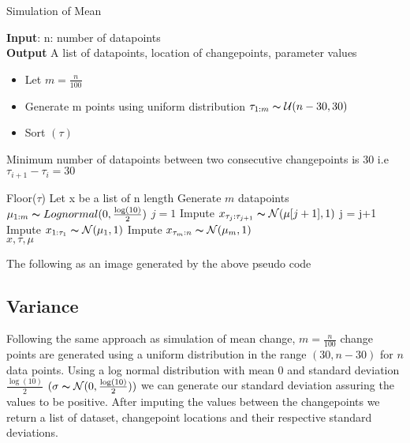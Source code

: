 \documentclass{article}
\newcommand\tab[1][0.4cm]{\hspace*{#1}}
\begin{document}
\begin{algorithm}
\caption{Simulation of Mean}\label{alg:cap}
\textbf{Input}: n: number of datapoints\\
\textbf{Output} A list of datapoints, location of changepoints, parameter values
\begin{algorithmic}
\begin{itemize}
    \item  Let $ m = \frac{n}{100}$
    \item  Generate m points using uniform distribution $\tau_{1:m} \thicksim \mathcal{U} (n-30,30)$ 
    \item  Sort $(\tau)$
\end{itemize}
     \Ensure Minimum number of datapoints between two consecutive changepoints \tab \tab \tab \tab \quad is 30 i.e $\tau_{i+1} - \tau_{i} = 30$ 

\State Floor($\tau$)
\State Let x be a list of n length
\State Generate $m$ datapoints $\mu_{1:m} \thicksim Lognormal(0,\frac{\log(10)}{2})$
\State $j = 1$
    \State Impute  $x_{\tau_{j} : \tau_{j+1}} \thicksim \mathcal{N}(\mu[j+1],1)$
    \State j = j+1
\EndWhile
\State Impute $x_{1:\tau_{1}} \thicksim \mathcal{N}(\mu_{1},1)$
\State Impute $x_{\tau_{m}:n} \thicksim \mathcal{N}(\mu_{m},1)$ \\
\Return $x,\tau,\mu$
\end{algorithmic}
\end{algorithm}

The following as an image generated by the above pseudo code

\subsection{Variance}
Following the same approach as simulation of mean change, $m = \frac{n}{100}$ change points are generated using a uniform distribution in the range $(30,n-30)$ for $n$ data points. Using a log normal distribution with mean 0 and standard deviation $\frac{\log(10)}{2}$ $(\sigma \thicksim \mathcal{N}(0,\frac{\log(10)}{2}))$ we can generate our standard deviation assuring the values to be positive. After imputing the values between the changepoints we return a list of dataset, changepoint locations and their respective standard deviations. 
\end{document}
